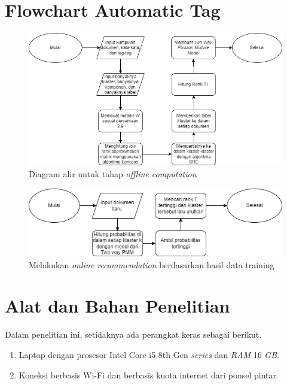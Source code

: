 \section{Flowchart Automatic Tag}
\begin{figure}[H]
    \centering
    \includegraphics[width=1\textwidth]{gambar/Tag Flowchart.drawio.png}
    \caption{Diagram alir untuk tahap \textit{offline computation}}
    \label{gambar:flowchart_automatic_tag}
\end{figure}

\begin{figure}[H]
    \centering
    \includegraphics[width=1\textwidth]{gambar/Online Recommendation Flowchart.png}
    \caption{Melakukan \textit{online recommendation} berdasarkan hasil data training}
    \label{gambar:online_recomendation_tag}
\end{figure}

\section{Alat dan Bahan Penelitian}

Dalam penelitian ini, setidaknya ada perangkat keras sebagai berikut.

\begin{enumerate}
    \item Laptop dengan prosesor Intel Core i5 8th Gen \textit{series} dan \textit{RAM} 16 \textit{GB}.
    \item Koneksi berbasis Wi-Fi dan berbasis kuota internet dari ponsel pintar.
\end{enumerate}

